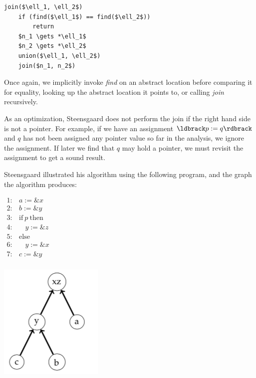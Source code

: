 \documentclass[11pt]{article}
\begin{document}
\begin{lstlisting}[mathescape]
join($\ell_1, \ell_2$)
    if (find($\ell_1$) == find($\ell_2$))
        return
    $n_1 \gets *\ell_1$
    $n_2 \gets *\ell_2$
    union($\ell_1, \ell_2$)
    join($n_1, n_2$)
\end{lstlisting}


Once again, we implicitly invoke \textit{find} on an abstract location before comparing it for equality, looking up the abstract location it points to, or calling \textit{join} recursively.

As an optimization, Steensgaard does not perform the join if the right hand side is not a pointer.  For example, if we have an assignment $\parg{p := q}$ and $q$ has not been assigned any pointer value so far in the analysis, we ignore the assignment.  If later we find that $q$ may hold a pointer, we must revisit the assignment to get a sound result.

Steensgaard illustrated his algorithm using the following program, and the graph
the algorithm produces:

\begin{center}
\begin{minipage}[t]{0.3\textwidth}
\vspace{-10em}
$\begin{array}{ll}
1: & a := \&x\\
2: & b := \&y\\
3: & \mbox{if}~ p ~\mbox{then}\\
4: & ~~~~ y := \&z\\
5: & \mbox{else}\\
6: & ~~~~ y := \&x\\
7: & c := \&y\\
\end{array}
$
\end{minipage}
\hspace*{1em}
\begin{minipage}[b]{0.30\textwidth}
\includegraphics[scale=0.6]{images/steensgard1}
\end{minipage}
\end{center}
\end{document}
